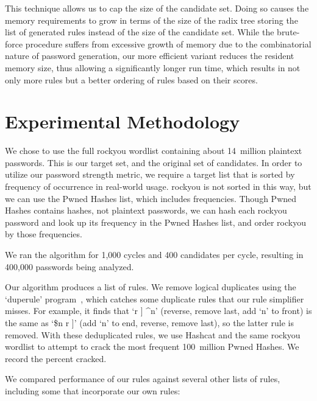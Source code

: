 \documentclass[letterpaper,twocolumn,10pt]{article}
\begin{document}
This technique allows us to cap the size of the candidate set. Doing so causes
the memory requirements to grow in terms of the size of the radix tree storing
the list of generated rules instead of the size of the candidate set. While the
brute-force procedure suffers from excessive growth of memory due to the
combinatorial nature of password generation, our more efficient variant reduces
the resident memory size, thus allowing a significantly longer run time, which
results in not only more rules but a better ordering of rules based on their
scores.

\section{Experimental Methodology}
\label{sec:methodology}

We chose to use the full rockyou wordlist containing about 14~million plaintext
passwords. This is our target set, and the original set of candidates. In order
to utilize our password strength metric, we require a target list that is
sorted by frequency of occurrence in real-world usage. rockyou is not sorted in
this way, but we can use the Pwned Hashes list, which includes frequencies.
Though Pwned Hashes contains hashes, not plaintext passwords, we can hash each
rockyou password and look up its frequency in the Pwned Hashes list, and order
rockyou by those frequencies.

We ran the algorithm for 1,000 cycles and 400 candidates per cycle, resulting
in 400,000 passwords being analyzed.

Our algorithm produces a list of rules. We remove logical duplicates using the `duperule' program~\cite{duprule}, which catches some duplicate rules that our rule simplifier misses. For example, it finds that `r ] \^{}n' (reverse, remove last, add `n' to front) is the same as `\$n r ]' (add `n' to end, reverse, remove last), so the latter rule is removed. With these deduplicated rules, we use Hashcat and the same rockyou wordlist to attempt to crack the most frequent 100~million Pwned Hashes. We record the percent cracked.

We compared performance of our rules against several other lists of rules,
including some that incorporate our own rules:
\end{document}

